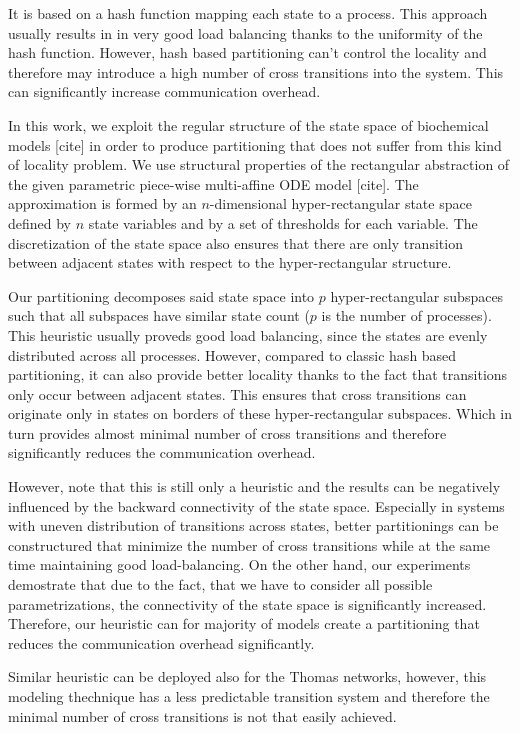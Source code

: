 \documentclass[12pt,oneside,draft]{fithesis2}
\begin{document}
			It is based on a hash function mapping each state to a process. This approach usually results in in very good load balancing thanks to the uniformity of the hash function. However, hash based partitioning can't control the locality and therefore may introduce a high number of cross transitions into the system. This can significantly increase communication overhead.
			
			In this work, we exploit the regular structure of the state space of biochemical models [cite] in order to produce partitioning that does not suffer from this kind of locality problem. We use structural properties of the rectangular abstraction of the given parametric piece-wise multi-affine ODE model [cite]. The approximation is formed by an $n$-dimensional hyper-rectangular state space defined by $n$ state variables and by a set of thresholds for each variable. The discretization of the state space also ensures that there are only transition between adjacent states with respect to the hyper-rectangular structure.
			
			Our partitioning decomposes said state space into $p$ hyper-rectangular subspaces such that all subspaces have similar state count ($p$ is the number of processes). This heuristic usually proveds good load balancing, since the states are evenly distributed across all processes. However, compared to classic hash based partitioning, it can also provide better locality thanks to the fact that transitions only occur between adjacent states. This ensures that cross transitions can originate only in states on borders of these hyper-rectangular subspaces. Which in turn provides almost minimal number of cross transitions and therefore significantly reduces the communication overhead.
			
			However, note that this is still only a heuristic and the results can be negatively influenced by the backward connectivity of the state space. Especially in systems with uneven distribution of transitions across states, better partitionings can be constructured that minimize the number of cross transitions while at the same time maintaining good load-balancing. On the other hand, our experiments demostrate that due to the fact, that we have to consider all possible parametrizations, the connectivity of the state space is significantly increased. Therefore, our heuristic can for majority of models create a partitioning that reduces the communication overhead significantly. 
			
			Similar heuristic can be deployed also for the Thomas networks, however, this modeling thechnique has a less predictable transition system and therefore the minimal number of cross transitions is not that easily achieved. 
			
\end{document}
